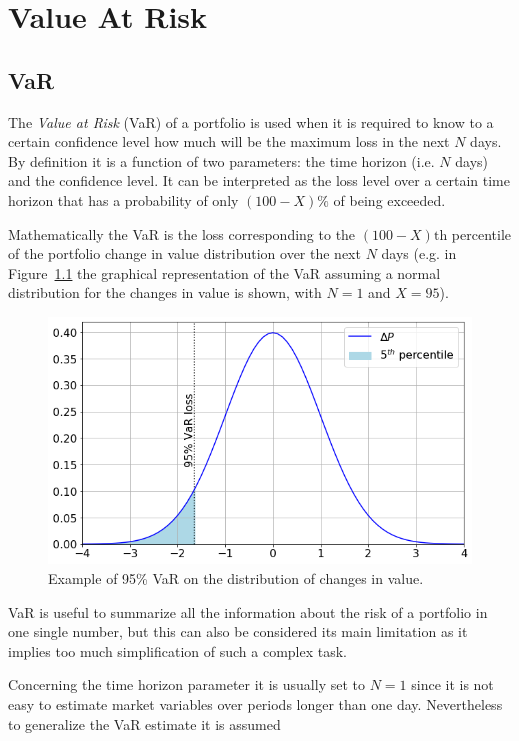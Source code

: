 \chapter{Value At Risk}
\label{var-and-credit-risk}

\section{VaR}
\label{value-at-risk}

The \emph{Value at Risk} (VaR) of a portfolio is used when it is required to know to a certain confidence level how much will be the maximum loss in the next $N$ days. By definition it is a function of two parameters: the time horizon (i.e. $N$ days) and the confidence level. 
It can be interpreted as the loss level over a certain time horizon that has a probability of only \((100 - X)\%\) of being exceeded. 

Mathematically the VaR is the loss corresponding to the \((100-X)\textrm{th}\) percentile of the portfolio change in value distribution over the next $N$ days (e.g. in Figure~\ref{fig:var_loss} the graphical representation of the VaR assuming a normal distribution for the changes in value is shown, with $N=1$ and $X=95$).

\begin{figure}[htb]
\centering
  \includegraphics[width=0.6\linewidth]{figures/95_var.png}
  \caption{Example of 95\% VaR on the distribution of changes in value.}
  \label{fig:var_loss}
\end{figure}
    
VaR is useful to summarize all the information about the risk of a portfolio in one single number, but this can also be considered its main limitation as it implies too much simplification of such a complex task.

Concerning the time horizon parameter it is usually set to $N=1$ since it is not easy to estimate market variables over periods longer than one day. Nevertheless to generalize the VaR estimate it is assumed

